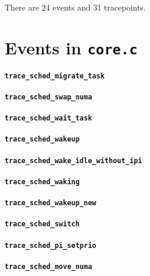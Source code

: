 There are 24 events and 31 tracepoints.


\section{Events in \texttt{core.c}} %

\paragraph{\texttt{trace\_sched\_migrate\_task}}
\paragraph{\texttt{trace\_sched\_swap\_numa}}
\paragraph{\texttt{trace\_sched\_wait\_task}}
\paragraph{\texttt{trace\_sched\_wakeup}}
\paragraph{\texttt{trace\_sched\_wake\_idle\_without\_ipi}}
\paragraph{\texttt{trace\_sched\_waking}}
\paragraph{\texttt{trace\_sched\_wakeup\_new}}
\paragraph{\texttt{trace\_sched\_switch}}
\paragraph{\texttt{trace\_sched\_pi\_setprio}}
\paragraph{\texttt{trace\_sched\_move\_numa}}

